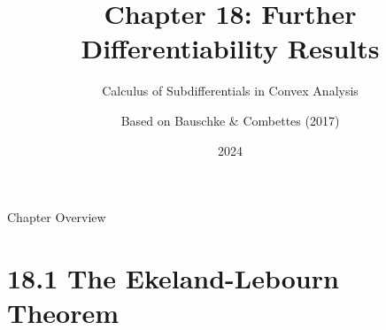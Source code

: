 \documentclass[aspectratio=169,10pt]{beamer}
\title{Chapter 18: Further Differentiability Results}
\subtitle{Calculus of Subdifferentials in Convex Analysis}
\author{Based on Bauschke \& Combettes (2017)}
\date{2024}
\theoremstyle{definition}
\begin{document}

\begin{frame}
  \titlepage
\end{frame}


\begin{frame}{Chapter Overview}
\tableofcontents
\end{frame}


\section{18.1 The Ekeland-Lebourn Theorem}
\end{document}
